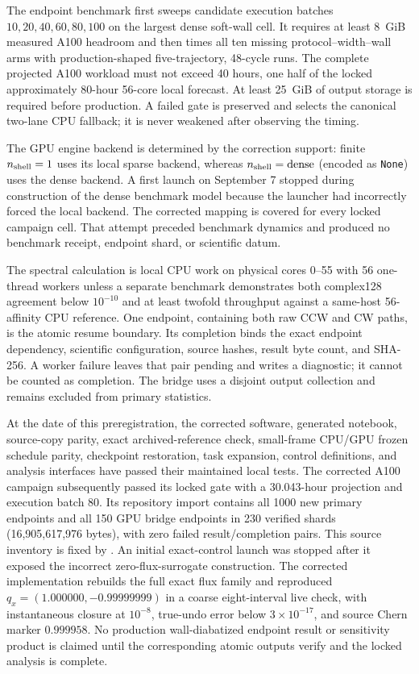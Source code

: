 \documentclass[aps,prb,twocolumn,floatfix,nofootinbib]{revtex4-2}
\begin{document}
The endpoint benchmark first sweeps candidate execution batches
$10,20,40,60,80,100$ on the largest dense soft-wall cell.  It requires at
least 8~GiB measured A100 headroom and then times all ten missing
protocol--width--wall arms with production-shaped five-trajectory,
48-cycle runs.  The complete projected A100 workload must not exceed 40 hours,
one half of the locked approximately 80-hour 56-core local forecast.  At
least 25~GiB of output storage is required before production.  A failed gate
is preserved and selects the canonical two-lane CPU fallback; it is never
weakened after observing the timing.

The GPU engine backend is determined by the correction support: finite
$n_{\rm shell}=1$ uses its local sparse backend, whereas
$n_{\rm shell}=\mathrm{dense}$ (encoded as \texttt{None}) uses the dense
backend.  A first launch on September 7 stopped during construction of the
dense benchmark model because the launcher had incorrectly forced the local
backend.  The corrected mapping is covered for every locked campaign cell.
That attempt preceded benchmark dynamics and produced no benchmark receipt,
endpoint shard, or scientific datum.

The spectral calculation is local CPU work on physical cores 0--55 with 56
one-thread workers unless a separate benchmark demonstrates both complex128
agreement below $10^{-10}$ and at least twofold throughput against a
same-host 56-affinity CPU reference.  One endpoint, containing both raw CCW
and CW paths, is the atomic resume boundary.  Its completion binds the exact
endpoint dependency, scientific configuration, source hashes, result byte
count, and SHA-256.  A worker failure leaves that pair pending and writes a
diagnostic; it cannot be counted as completion.  The bridge uses a disjoint
output collection and remains excluded from primary statistics.

At the date of this preregistration, the corrected software, generated notebook,
source-copy parity, exact archived-reference check, small-frame CPU/GPU frozen
schedule parity, checkpoint restoration, task expansion, control definitions,
and analysis interfaces have passed their maintained local tests.  The
corrected A100 campaign subsequently passed its locked gate with a 30.043-hour
projection and execution batch 80.  Its repository import contains all 1000
new primary endpoints and all 150 GPU bridge endpoints in 230 verified shards
(16,905,617,976 bytes), with zero failed result/completion pairs.  This source
inventory is fixed by
.
An initial exact-control launch was stopped after it exposed the incorrect
zero-flux-surrogate construction. The corrected implementation rebuilds the
full exact flux family and reproduced $q_x=(1.000000,-0.99999999)$ in a
coarse eight-interval live check, with instantaneous closure at $10^{-8}$,
true-undo error below $3\times10^{-17}$, and source Chern marker $0.999958$.
No production
wall-diabatized endpoint result or sensitivity product is claimed until the
corresponding atomic outputs verify and the locked analysis is complete.
\end{document}
